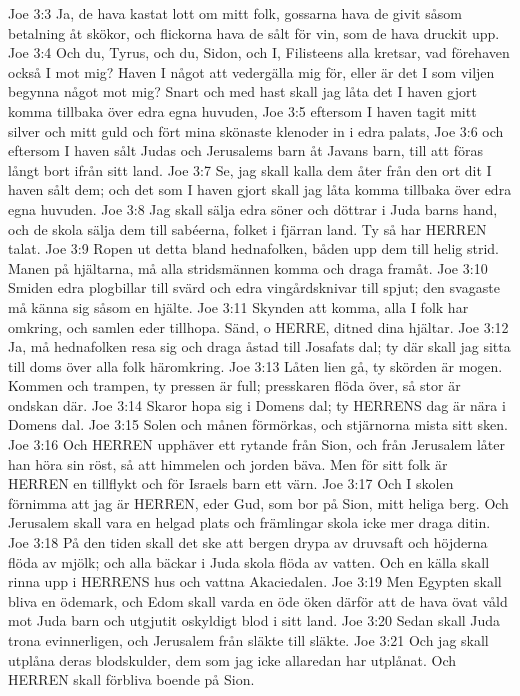 Joe 3:3  Ja, de hava kastat lott om mitt folk, gossarna hava de givit såsom betalning åt skökor, och flickorna hava de sålt för vin, som de hava druckit upp.
Joe 3:4  Och du, Tyrus, och du, Sidon, och I, Filisteens alla kretsar, vad förehaven också I mot mig? Haven I något att vedergälla mig för, eller är det I som viljen begynna något mot mig? Snart och med hast skall jag låta det I haven gjort komma tillbaka över edra egna huvuden,
Joe 3:5  eftersom I haven tagit mitt silver och mitt guld och fört mina skönaste klenoder in i edra palats,
Joe 3:6  och eftersom I haven sålt Judas och Jerusalems barn åt Javans barn, till att föras långt bort ifrån sitt land.
Joe 3:7  Se, jag skall kalla dem åter från den ort dit I haven sålt dem; och det som I haven gjort skall jag låta komma tillbaka över edra egna huvuden.
Joe 3:8  Jag skall sälja edra söner och döttrar i Juda barns hand, och de skola sälja dem till sabéerna, folket i fjärran land. Ty så har HERREN talat.
Joe 3:9  Ropen ut detta bland hednafolken, båden upp dem till helig strid. Manen på hjältarna, må alla stridsmännen komma och draga framåt.
Joe 3:10  Smiden edra plogbillar till svärd och edra vingårdsknivar till spjut; den svagaste må känna sig såsom en hjälte.
Joe 3:11  Skynden att komma, alla I folk har omkring, och samlen eder tillhopa. Sänd, o HERRE, ditned dina hjältar.
Joe 3:12  Ja, må hednafolken resa sig och draga åstad till Josafats dal; ty där skall jag sitta till doms över alla folk häromkring.
Joe 3:13  Låten lien gå, ty skörden är mogen. Kommen och trampen, ty pressen är full; presskaren flöda över, så stor är ondskan där.
Joe 3:14  Skaror hopa sig i Domens dal; ty HERRENS dag är nära i Domens dal.
Joe 3:15  Solen och månen förmörkas, och stjärnorna mista sitt sken.
Joe 3:16  Och HERREN upphäver ett rytande från Sion, och från Jerusalem låter han höra sin röst, så att himmelen och jorden bäva. Men för sitt folk är HERREN en tillflykt och för Israels barn ett värn.
Joe 3:17  Och I skolen förnimma att jag är HERREN, eder Gud, som bor på Sion, mitt heliga berg. Och Jerusalem skall vara en helgad plats och främlingar skola icke mer draga ditin.
Joe 3:18  På den tiden skall det ske att bergen drypa av druvsaft och höjderna flöda av mjölk; och alla bäckar i Juda skola flöda av vatten. Och en källa skall rinna upp i HERRENS hus och vattna Akaciedalen.
Joe 3:19  Men Egypten skall bliva en ödemark, och Edom skall varda en öde öken därför att de hava övat våld mot Juda barn och utgjutit oskyldigt blod i sitt land.
Joe 3:20  Sedan skall Juda trona evinnerligen, och Jerusalem från släkte till släkte.
Joe 3:21  Och jag skall utplåna deras blodskulder, dem som jag icke allaredan har utplånat. Och HERREN skall förbliva boende på Sion.


